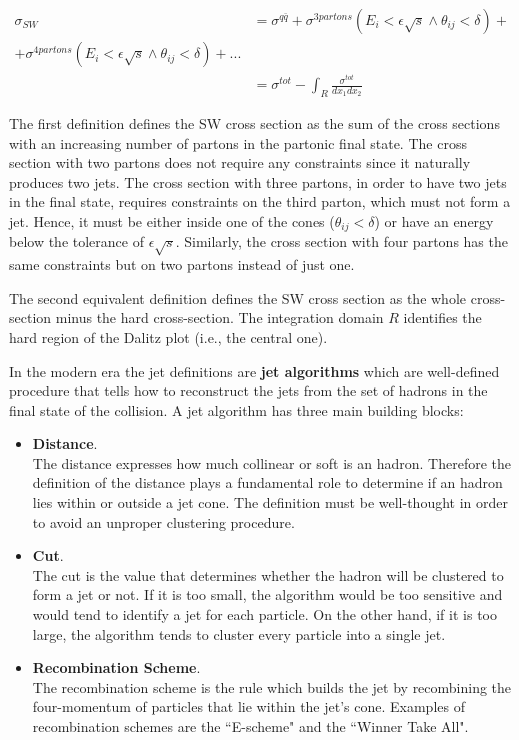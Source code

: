 \begin{align}
    \sigma_{SW} &= \sigma^{q \bar{q}} + \sigma^{3 partons}(E_i < \epsilon \sqrt{s} \land \theta_{ij} < \delta) + \\
    + \sigma^{4 partons}(E_i < \epsilon \sqrt{s} \land \theta_{ij} < \delta) + ... \\
    &= \sigma^{tot} - \int_{R} \frac{\sigma^{tot}}{d x_1 d x_2}
\end{align}


The first definition defines the SW cross section as the sum of the cross sections with an increasing number 
of partons in the partonic final state. The cross section with two partons does not require any constraints 
since it naturally produces two jets. The cross section with three partons, in order to have two jets in the 
final state, requires constraints on the third parton, which must not form a jet. Hence, it must be either 
inside one of the cones ($\theta_{ij} < \delta$) or have an energy below the tolerance of $\epsilon \sqrt{s}$. 
Similarly, the cross section with four partons has the same constraints but on two partons instead of just one.

The second equivalent definition defines the SW cross section as the whole cross-section minus the hard 
cross-section.
The integration domain $R$ identifies the hard region of the Dalitz plot (i.e., the central one).


In the modern era the jet definitions are \textbf{jet algorithms} which are well-defined procedure that tells 
how to reconstruct the jets from the set of hadrons in the final state of the collision.
A jet algorithm has three main building blocks:

\begin{itemize}
    \item \textbf{Distance}.\\
    The distance expresses how much collinear or soft is an hadron.
    Therefore the definition of the distance plays a fundamental role to determine if an hadron lies within or
    outside a jet cone.
    The definition must be well-thought in order to avoid an unproper clustering procedure.
    \item \textbf{Cut}.\\
    The cut is the value that determines whether the hadron will be clustered to form a jet or not. 
    If it is too small, the algorithm would be too sensitive and would tend to identify a jet for each particle. 
    On the other hand, if it is too large, the algorithm tends to cluster every particle into a single jet.
    \item \textbf{Recombination Scheme}.\\
    The recombination scheme is the rule which builds the jet by recombining the four-momentum of particles
    that lie within the jet's cone.
    Examples of recombination schemes are the “E-scheme" and the “Winner Take All".
\end{itemize}

